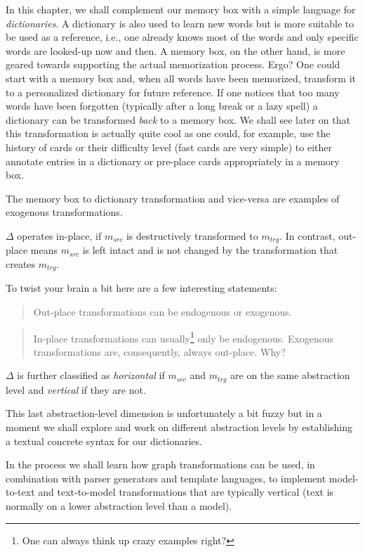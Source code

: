 In this chapter, we shall complement our memory box with a simple language for \emph{dictionaries}.
A dictionary is also used to learn new words but is more suitable to be used as a reference, i.e., one already knows most of the words and only specific words are looked-up now and then.
A memory box, on the other hand, is more geared towards supporting the actual memorization process.
Ergo?  One could start with a memory box and, when all words have been memorized, transform it to a personalized dictionary for future reference.
If one notices that too many words have been forgotten (typically after a long break or a lazy spell) a dictionary can be transformed \emph{back} to a memory box.
We shall see later on that this transformation is actually quite cool as one could, for example, use the history of cards or their difficulty level (fast cards are very simple) to either annotate entries in a dictionary or pre-place cards appropriately in a memory box. 

The memory box to dictionary transformation and vice-versa are examples of exogenous transformations.

$\Delta$ operates in-place, if $m_{src}$ is destructively transformed to $m_{trg}$.
In contrast, out-place means $m_{src}$ is left intact and is not changed by the transformation that creates $m_{trg}$.
 
\vspace{1.5cm}
 
To twist your brain a bit here are a few interesting statements:
\begin{quote}
Out-place transformations can be endogenous or exogenous.
\end{quote}  
\begin{quote}
In-place transformations can usually\footnote{One can always think up crazy examples right?} only be endogenous.  Exogenous transformations are, consequently, always out-place.  Why? 
\end{quote}  
   
\clearpage
$\Delta$ is further classified as \emph{horizontal} if $m_{src}$ and $m_{trg}$ are on the same abstraction level and \emph{vertical} if they are not. 


This last abstraction-level dimension is unfortunately a bit fuzzy but in a moment we shall explore and work on different abstraction levels by establishing a textual concrete syntax for our dictionaries.

In the process we shall learn how graph transformations can be used, in combination with parser generators and template languages, to implement model-to-text and text-to-model transformations that are typically vertical (text is normally on a lower abstraction level than a model).  

